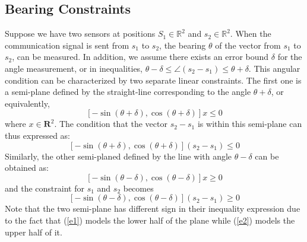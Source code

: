 \documentclass[journal]{IEEEtran}
\begin{document}
\subsection{Bearing Constraints}
Suppose we have two sensors at positions $S_1\in\mathbb{R}^2$ and $s_2\in\mathbb{R}^2$. When the communication signal is sent from $s_1$ to $s_2$, the bearing $\theta$ of the vector from $s_1$ to $s_2$, can be measured. In addition, we assume there exists an error bound $\delta$ for the angle measurement, or in inequalities, $\theta-\delta\leq\angle (s_2-s_1)\leq\theta+\delta$. This angular condition can be characterized by two separate linear constraints. The first one is a semi-plane defined by the straight-line corresponding to the angle $\theta+\delta$, or equivalently,
\begin{equation}\label{e1}
[-\sin(\theta+\delta),\cos(\theta+\delta)]x\leq0
\end{equation}
where $x\in\mathbf{R}^2$. The condition that the vector $s_2-s_1$ is within this semi-plane can thus expressed as:
\begin{equation}\label{e12}
[-\sin(\theta+\delta),\cos(\theta+\delta)](s_2-s_1)\leq 0
\end{equation}
Similarly, the other semi-planed defined by the line with angle $\theta-\delta$ can be obtained as:
\begin{equation}\label{e2}
[-\sin(\theta-\delta),\cos(\theta-\delta)]x\geq 0
\end{equation}
and the constraint for $s_1$ and $s_2$ becomes
\begin{equation}\label{e22}
[-\sin(\theta-\delta),\cos(\theta-\delta)](s_2-s_1)\geq 0
\end{equation}
Note that the two semi-plane has different sign in their inequality expression due to the fact that (\ref{e1}) models the lower half of the plane while (\ref{e2}) models the upper half of it.
\end{document}
